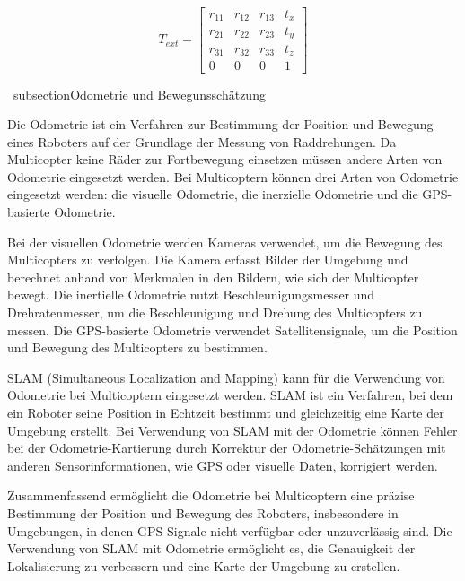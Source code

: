 \begin{figure}
    \begin{equation*}
        T_{ext}=\begin{bmatrix}
            r_{11} & r_{12} & r_{13} & t_x\\
            r_{21} & r_{22} & r_{23} & t_y\\
            r_{31} & r_{32} & r_{33} & t_z\\
            0 & 0 & 0 & 1
            \end{bmatrix}   
    \end{equation*}
\end{figure}

\ subsection{Odometrie und Bewegunsschätzung}

Die Odometrie ist ein Verfahren zur Bestimmung der Position und Bewegung eines Roboters auf der Grundlage der Messung von Raddrehungen. Da Multicopter keine Räder zur Fortbewegung einsetzen müssen andere Arten von Odometrie eingesetzt werden. Bei Multicoptern können drei Arten von Odometrie eingesetzt werden: die visuelle Odometrie, die inerzielle Odometrie und die GPS-basierte Odometrie.


Bei der visuellen Odometrie werden Kameras verwendet, um die Bewegung des Multicopters zu verfolgen. Die Kamera erfasst Bilder der Umgebung und berechnet anhand von Merkmalen in den Bildern, wie sich der Multicopter bewegt. Die inertielle Odometrie nutzt Beschleunigungsmesser und Drehratenmesser, um die Beschleunigung und Drehung des Multicopters zu messen. Die GPS-basierte Odometrie verwendet Satellitensignale, um die Position und Bewegung des Multicopters zu bestimmen.

SLAM (Simultaneous Localization and Mapping) kann für die Verwendung von Odometrie bei Multicoptern eingesetzt werden. SLAM ist ein Verfahren, bei dem ein Roboter seine Position in Echtzeit bestimmt und gleichzeitig eine Karte der Umgebung erstellt. Bei Verwendung von SLAM mit der Odometrie können Fehler bei der Odometrie-Kartierung durch Korrektur der Odometrie-Schätzungen mit anderen Sensorinformationen, wie GPS oder visuelle Daten, korrigiert werden.

Zusammenfassend ermöglicht die Odometrie bei Multicoptern eine präzise Bestimmung der Position und Bewegung des Roboters, insbesondere in Umgebungen, in denen GPS-Signale nicht verfügbar oder unzuverlässig sind. Die Verwendung von SLAM mit Odometrie ermöglicht es, die Genauigkeit der Lokalisierung zu verbessern und eine Karte der Umgebung zu erstellen.

